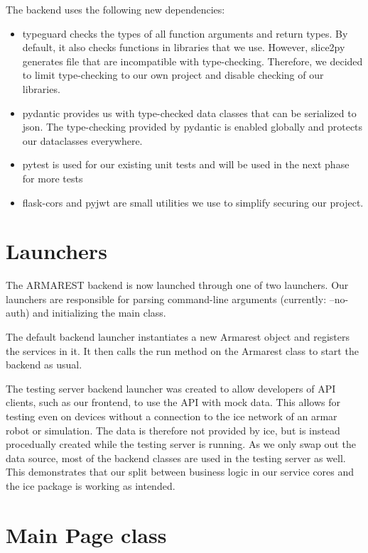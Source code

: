 The \gls{backend} uses the following new dependencies:
\begin{itemize}
    \item typeguard checks the types of all function arguments and return types. By default, it also checks functions in libraries that we use. However, slice2py generates file that are incompatible with type-checking. Therefore, we decided to limit type-checking to our own project and disable checking of our libraries.
    \item pydantic provides us with type-checked data classes that can be serialized to json. The type-checking provided by pydantic is enabled globally and protects our dataclasses everywhere.
    \item pytest is used for our existing unit tests and will be used in the next phase for more tests
    \item flask-cors and pyjwt are small utilities we use to simplify securing our project.
\end{itemize}

\section{Launchers}

The ARMAREST \gls{backend} is now launched through one of two launchers.
Our launchers are responsible for parsing command-line arguments (currently: --no-auth) and initializing the main class.

The default \gls{backend} launcher instantiates a new Armarest object and registers the services in it.
It then calls the run method on the Armarest class to start the \gls{backend} as usual.

The testing server \gls{backend} launcher was created to allow developers of API clients, such as our \gls{frontend}, to use the API with mock data.
This allows for testing even on devices without a connection to the \gls{ice} network of an \gls{armar} robot or simulation.
The data is therefore not provided by \gls{ice}, but is instead procedually created while the testing server is running.
As we only swap out the data source, most of the \gls{backend} classes are used in the testing server as well.
This demonstrates that our split between business logic in our service cores and the \gls{ice} package is working as intended.

\section{Main Page class}

